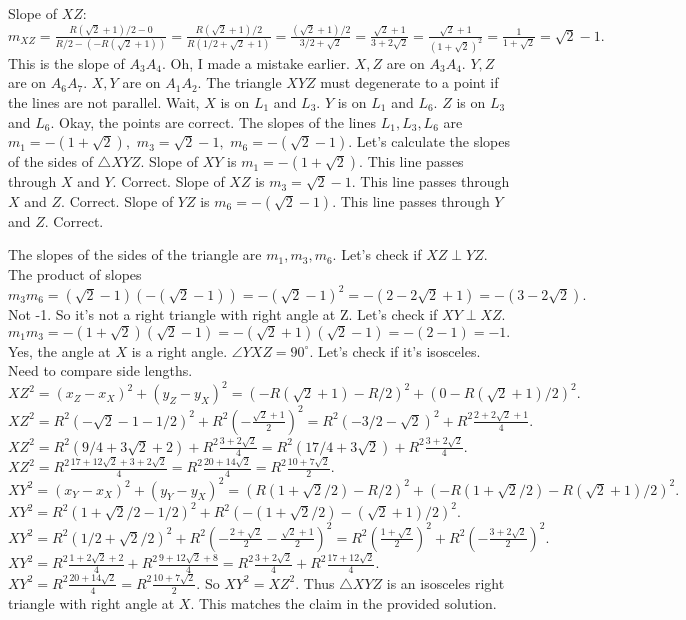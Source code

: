 Slope of $XZ$: $m_{XZ} = \frac{R(\sqrt{2}+1)/2 - 0}{R/2 - (-R(\sqrt{2}+1))} = \frac{R(\sqrt{2}+1)/2}{R(1/2+\sqrt{2}+1)} = \frac{(\sqrt{2}+1)/2}{3/2+\sqrt{2}} = \frac{\sqrt{2}+1}{3+2\sqrt{2}} = \frac{\sqrt{2}+1}{(1+\sqrt{2})^2} = \frac{1}{1+\sqrt{2}} = \sqrt{2}-1.$ This is the slope of $A_3A_4.$ Oh, I made a mistake earlier. $X, Z$ are on $A_3A_4.$ $Y, Z$ are on $A_6A_7.$ $X, Y$ are on $A_1A_2.$ The triangle $XYZ$ must degenerate to a point if the lines are not parallel. Wait, $X$ is on $L_1$ and $L_3.$ $Y$ is on $L_1$ and $L_6.$ $Z$ is on $L_3$ and $L_6.$ Okay, the points are correct. The slopes of the lines $L_1, L_3, L_6$ are $m_1 = -(1+\sqrt{2}),$ $m_3 = \sqrt{2}-1,$ $m_6 = -(\sqrt{2}-1).$ 
Let's calculate the slopes of the sides of $\triangle XYZ.$ 
Slope of $XY$ is $m_1 = -(1+\sqrt{2}).$ This line passes through $X$ and $Y.$ Correct. 
Slope of $XZ$ is $m_3 = \sqrt{2}-1.$ This line passes through $X$ and $Z.$ Correct. 
Slope of $YZ$ is $m_6 = -(\sqrt{2}-1).$ This line passes through $Y$ and $Z.$ Correct.

The slopes of the sides of the triangle are $m_1, m_3, m_6.$ 
Let's check if $XZ \perp YZ.$ The product of slopes $m_3 m_6 = (\sqrt{2}-1)(-(\sqrt{2}-1)) = -(\sqrt{2}-1)^2 = -(2-2\sqrt{2}+1) = -(3-2\sqrt{2}).$ Not -1. So it's not a right triangle with right angle at Z. 
Let's check if $XY \perp XZ.$ $m_1 m_3 = -(1+\sqrt{2})(\sqrt{2}-1) = -( \sqrt{2}+1)(\sqrt{2}-1) = -(2-1) = -1.$ Yes, the angle at $X$ is a right angle. $\angle YXZ = 90^\circ.$ 
Let's check if it's isosceles. Need to compare side lengths. 
$XZ^2 = (x_Z - x_X)^2 + (y_Z - y_X)^2 = (-R(\sqrt{2}+1) - R/2)^2 + (0 - R(\sqrt{2}+1)/2)^2.$ 
$XZ^2 = R^2(-\sqrt{2}-1 - 1/2)^2 + R^2(-\frac{\sqrt{2}+1}{2})^2 = R^2 (-3/2-\sqrt{2})^2 + R^2 \frac{2+2\sqrt{2}+1}{4}.$ 
$XZ^2 = R^2 (9/4 + 3\sqrt{2} + 2) + R^2 \frac{3+2\sqrt{2}}{4} = R^2 (17/4 + 3\sqrt{2}) + R^2 \frac{3+2\sqrt{2}}{4}.$ 
$XZ^2 = R^2 \frac{17+12\sqrt{2} + 3+2\sqrt{2}}{4} = R^2 \frac{20+14\sqrt{2}}{4} = R^2 \frac{10+7\sqrt{2}}{2}.$ 
$XY^2 = (x_Y - x_X)^2 + (y_Y - y_X)^2 = (R(1+\sqrt{2}/2) - R/2)^2 + (-R(1+\sqrt{2}/2) - R(\sqrt{2}+1)/2)^2.$ 
$XY^2 = R^2(1+\sqrt{2}/2 - 1/2)^2 + R^2(-(1+\sqrt{2}/2) - (\sqrt{2}+1)/2)^2.$ 
$XY^2 = R^2(1/2+\sqrt{2}/2)^2 + R^2(-\frac{2+\sqrt{2}}{2} - \frac{\sqrt{2}+1}{2})^2 = R^2(\frac{1+\sqrt{2}}{2})^2 + R^2(-\frac{3+2\sqrt{2}}{2})^2.$ 
$XY^2 = R^2 \frac{1+2\sqrt{2}+2}{4} + R^2 \frac{9+12\sqrt{2}+8}{4} = R^2 \frac{3+2\sqrt{2}}{4} + R^2 \frac{17+12\sqrt{2}}{4}.$ 
$XY^2 = R^2 \frac{20+14\sqrt{2}}{4} = R^2 \frac{10+7\sqrt{2}}{2}.$ 
So $XY^2 = XZ^2.$ Thus $\triangle XYZ$ is an isosceles right triangle with right angle at $X.$ This matches the claim in the provided solution.

